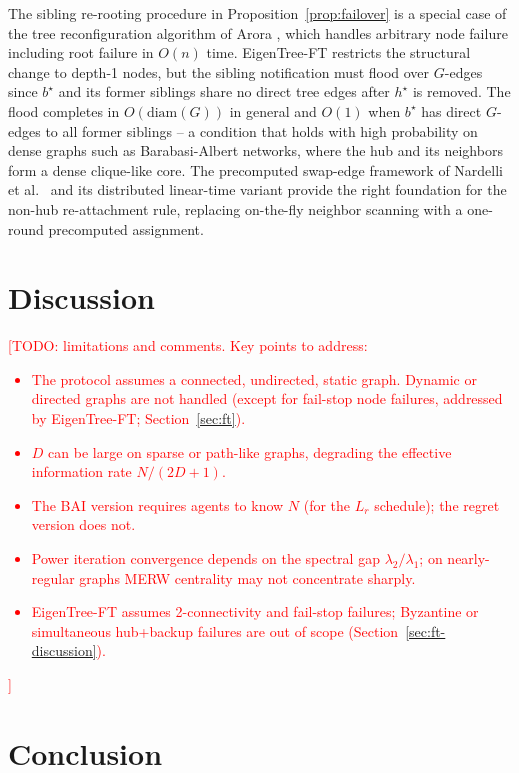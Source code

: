 \documentclass{article}
\newcommand{\merwft}{EigenTree-FT}
\begin{document}
The sibling re-rooting procedure in Proposition~\ref{prop:failover} is a special case
of the tree reconfiguration algorithm of Arora \citep{arora1994}, which handles arbitrary
node failure including root failure in $O(n)$ time. \merwft{} restricts the structural
change to depth-1 nodes, but the sibling notification must flood over $G$-edges since
$b^\star$ and its former siblings share no direct tree edges after $h^\star$ is removed.
The flood completes in $O(\mathrm{diam}(G))$ in general and $O(1)$ when $b^\star$ has
direct $G$-edges to all former siblings -- a condition that holds with high probability on
dense graphs such as Barabasi-Albert networks, where the hub and its neighbors form a
dense clique-like core. The precomputed swap-edge framework of Nardelli et al.\
\citep{nardelli2003} and its distributed linear-time variant \citep{datta2013} provide the
right foundation for the non-hub re-attachment rule, replacing on-the-fly neighbor
scanning with a one-round precomputed assignment.

\section{Discussion}
\label{sec:discussion}

\textcolor{red}{[TODO: limitations and comments. Key points to address:
\begin{itemize}
    \item The protocol assumes a connected, undirected, static graph. Dynamic or directed graphs are not handled (except for fail-stop node failures, addressed by \merwft; Section~\ref{sec:ft}).
    \item $D$ can be large on sparse or path-like graphs, degrading the effective information rate $N/(2D+1)$.
    \item The BAI version requires agents to know $N$ (for the $L_r$ schedule); the regret version does not.
    \item Power iteration convergence depends on the spectral gap $\lambda_2/\lambda_1$; on nearly-regular graphs MERW centrality may not concentrate sharply.
    \item \merwft{} assumes 2-connectivity and fail-stop failures; Byzantine or simultaneous hub+backup failures are out of scope (Section~\ref{sec:ft-discussion}).
\end{itemize}]}

\section{Conclusion}
\label{sec:conclusion}
\end{document}
